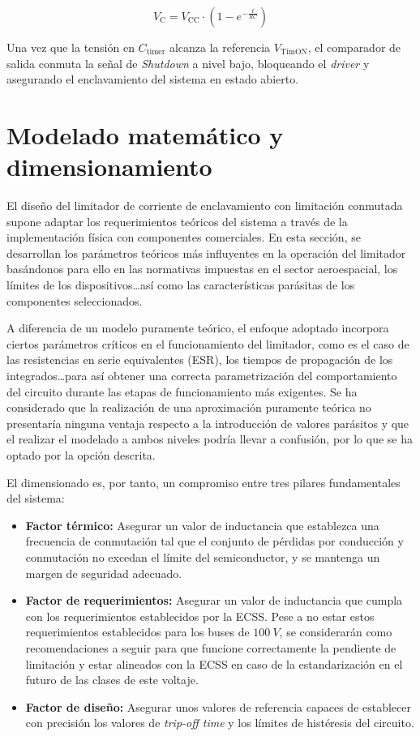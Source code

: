 \documentclass[12pt]{report} %
\begin{document}
\begin{equation}
    V_{\text{C}} = V_{\text{CC}} \cdot \left(1 - e^{-\frac{t}{RC}}\right)
    \label{eq:cargaCondensador}
\end{equation}

Una vez que la tensión en $C_\text{timer}$ alcanza la referencia $V_\text{TimON}$, el comparador de salida conmuta la señal de \textit{Shutdown} a nivel bajo, bloqueando el \textit{driver} y asegurando el enclavamiento del sistema en estado abierto.

\section{Modelado matemático y dimensionamiento}
\label{section:3.3}
El diseño del limitador de corriente de enclavamiento con limitación conmutada supone adaptar los requerimientos teóricos del sistema a través de la implementación física con componentes comerciales. En esta sección, se desarrollan los parámetros teóricos más influyentes en la operación del limitador basándonos para ello en las normativas impuestas en el sector aeroespacial, los límites de los dispositivos\dots así como las características parásitas de los componentes seleccionados. 

A diferencia de un modelo puramente teórico, el enfoque adoptado incorpora ciertos parámetros críticos en el funcionamiento del limitador, como es el caso de las resistencias en serie equivalentes (ESR), los tiempos de propagación de los integrados\dots para así obtener una correcta parametrización del comportamiento del circuito durante las etapas de funcionamiento más exigentes. Se ha considerado que la realización de una aproximación puramente teórica no presentaría ninguna ventaja respecto a la introducción de valores parásitos y que el realizar el modelado a ambos niveles podría llevar a confusión, por lo que se ha optado por la opción descrita.

El dimensionado es, por tanto, un compromiso entre tres pilares fundamentales del sistema: 
\begin{itemize}
    \item\textbf{Factor térmico:} Asegurar un valor de inductancia que establezca una frecuencia de conmutación tal que el conjunto de pérdidas por conducción y conmutación no excedan el límite del semiconductor, y se mantenga un margen de seguridad adecuado. 
    \item\textbf{Factor de requerimientos:} Asegurar un valor de inductancia que cumpla con los requerimientos establecidos por la ECSS. Pese a no estar estos requerimientos establecidos para los buses de $100~V$, se considerarán como recomendaciones a seguir para que funcione correctamente la pendiente de limitación y estar alineados con la ECSS en caso de la estandarización en el futuro de las clases de este voltaje.
    \item\textbf{Factor de diseño:} Asegurar unos valores de referencia capaces de establecer con precisión los valores de \textit{trip-off time} y los límites de histéresis del circuito.
\end{itemize}
\end{document}
